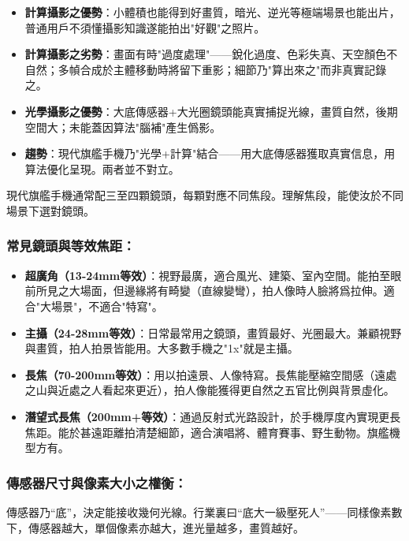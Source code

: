 \begin{itemize}
  \item \textbf{計算攝影之優勢}：小體積也能得到好畫質，暗光、逆光等極端場景也能出片，普通用戶不須懂攝影知識遂能拍出"好觀"之照片。
  \item \textbf{計算攝影之劣勢}：畫面有時"過度處理"——銳化過度、色彩失真、天空顏色不自然；多幀合成於主體移動時將留下重影；細節乃"算出來之"而非真實記錄之。
  \item \textbf{光學攝影之優勢}：大底傳感器+大光圈鏡頭能真實捕捉光線，畫質自然，後期空間大；未能蓋因算法"腦補"產生僞影。
  \item \textbf{趨勢}：現代旗艦手機乃"光學+計算"結合——用大底傳感器獲取真實信息，用算法優化呈現。兩者並不對立。
\end{itemize}


現代旗艦手機通常配三至四顆鏡頭，每顆對應不同焦段。理解焦段，能使汝於不同場景下選對鏡頭。

\subsubsection*{常見鏡頭與等效焦距：}

\begin{itemize}
  \item \textbf{超廣角（13-24mm等效）}：視野最廣，適合風光、建築、室內空間。能拍至眼前所見之大場面，但邊緣將有畸變（直線變彎），拍人像時人臉將爲拉伸。適合"大場景"，不適合"特寫"。
  \item \textbf{主攝（24-28mm等效）}：日常最常用之鏡頭，畫質最好、光圈最大。兼顧視野與畫質，拍人拍景皆能用。大多數手機之"1x"就是主攝。
  \item \textbf{長焦（70-200mm等效）}：用以拍遠景、人像特寫。長焦能壓縮空間感（遠處之山與近處之人看起來更近），拍人像能獲得更自然之五官比例與背景虛化。
  \item \textbf{潛望式長焦（200mm+等效）}：通過反射式光路設計，於手機厚度內實現更長焦距。能於甚遠距離拍清楚細節，適合演唱將、體育賽事、野生動物。旗艦機型方有。
\end{itemize}

\subsubsection*{傳感器尺寸與像素大小之權衡：}

傳感器乃“底”，決定能接收幾何光線。行業裏曰“底大一級壓死人”——同樣像素數下，傳感器越大，單個像素亦越大，進光量越多，畫質越好。

